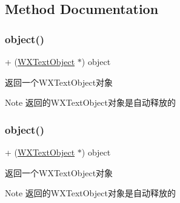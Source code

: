 \subsection{Method Documentation}
\mbox{\label{interface_w_x_text_object_a810c79d310cac1b35f891eabf5173f20}} 
\subsubsection{\texorpdfstring{object()}{object()}\hspace{0.1cm}{\footnotesize\ttfamily [1/3]}}
{\footnotesize\ttfamily + (\mbox{\hyperlink{interface_w_x_text_object}{W\+X\+Text\+Object}} $\ast$) object \begin{DoxyParamCaption}{ }\end{DoxyParamCaption}}



返回一个\+W\+X\+Text\+Object对象 

\begin{DoxyNote}{Note}
返回的\+W\+X\+Text\+Object对象是自动释放的 
\end{DoxyNote}
\mbox{\label{interface_w_x_text_object_a810c79d310cac1b35f891eabf5173f20}} 
\subsubsection{\texorpdfstring{object()}{object()}\hspace{0.1cm}{\footnotesize\ttfamily [2/3]}}
{\footnotesize\ttfamily + (\mbox{\hyperlink{interface_w_x_text_object}{W\+X\+Text\+Object}} $\ast$) object \begin{DoxyParamCaption}{ }\end{DoxyParamCaption}}



返回一个\+W\+X\+Text\+Object对象 

\begin{DoxyNote}{Note}
返回的\+W\+X\+Text\+Object对象是自动释放的 
\end{DoxyNote}
\mbox{\label{interface_w_x_text_object_a810c79d310cac1b35f891eabf5173f20}} 
